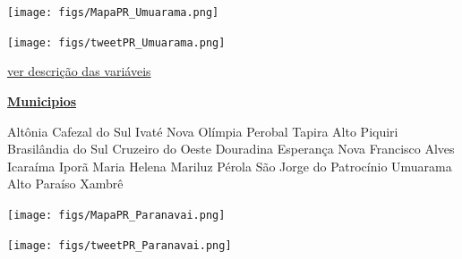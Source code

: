 \documentclass[10pt]{article} %
\begin{document}

\begin{minipage}[t]{.66\linewidth}
\hypertarget{Umrm}{}
\texttt{[image: figs/MapaPR\_Umuarama.png]}\vspace{0.5cm}\vspace{0.5cm}\begin{center}
\texttt{[image: figs/tweetPR\_Umuarama.png]}\end{center}
\begin{center}

\end{center}
\small{\hyperlink{vartab}{ver descrição das variáveis}}\end{minipage}\hfill\begin{minipage}[t]{.30\linewidth}
\begin{mdframed}[style=sidebar,frametitle={}]
\textbf{\hyperlink{municips}{Municipios}}\begin{itemize}\gsquare Altônia 
\gsquare Cafezal do Sul 
\gsquare Ivaté 
\gsquare Nova Olímpia 
\gsquare Perobal 
\gsquare Tapira 
\gsquare Alto Piquiri 
\gsquare Brasilândia do Sul 
\gsquare Cruzeiro do Oeste 
\gsquare Douradina 
\gsquare Esperança Nova 
\gsquare Francisco Alves 
\gsquare Icaraíma 
\gsquare Iporã 
\gsquare Maria Helena 
\gsquare Mariluz 
\gsquare Pérola 
\gsquare São Jorge do Patrocínio 
\gsquare Umuarama 
\gsquare Alto Paraíso 
\gsquare Xambrê 
\end{itemize}\BackToContents\end{mdframed}\hfill\end{minipage}\newpage\begin{minipage}[t]{.66\linewidth}
\hypertarget{Prnv}{}
\texttt{[image: figs/MapaPR\_Paranavai.png]}\vspace{0.5cm}\vspace{0.5cm}\begin{center}
\texttt{[image: figs/tweetPR\_Paranavai.png]}\end{center}

\end{minipage}
\end{document}
